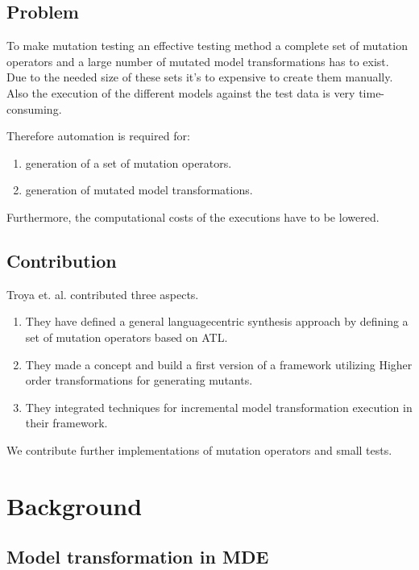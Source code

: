 \documentclass{llncs}
\begin{document}
\subsection{Problem}

To make mutation testing an effective testing method a complete set of mutation operators and a large number of mutated model transformations has to exist. Due to the needed size of these sets it's to expensive to create them manually. Also the execution of the different models against the test data is very time-consuming.

Therefore automation is required for:

\begin{enumerate}
	\item generation of a set of mutation operators.
	\item generation of mutated model transformations.
\end{enumerate}

Furthermore, the computational costs of the executions have to be lowered.

\subsection{Contribution}

Troya et. al. contributed three aspects.

\begin{enumerate}
	\item They have defined a general languagecentric synthesis approach by defining a set of mutation operators based on ATL. 
	\item They made a concept and build a first version of a framework utilizing Higher order transformations for generating mutants.\cite{Paige:2009}
	\item They integrated techniques\cite{Bergmayr:2014} for incremental model transformation execution in their framework.
\end{enumerate}

We contribute further implementations of mutation operators and small tests.

\section{Background}

\subsection{Model transformation in MDE}
\end{document}
